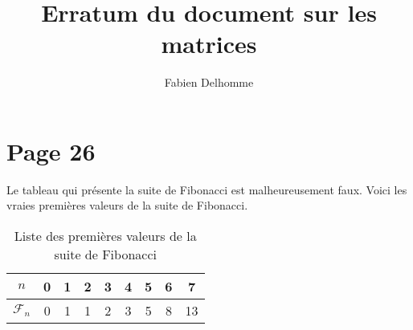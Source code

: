 \documentclass[12pt]{article}
\title{Erratum du document sur les matrices}
\author{Fabien Delhomme}
\begin{document}
\maketitle

\section{Page 26}

Le tableau qui présente la suite de Fibonacci est malheureusement faux. Voici
les vraies premières valeurs de la suite de Fibonacci.
\begin{table}[h]
    \centering
    \begin{tabular}{|c|c|c|c|c|c|c|c|c|}
        \hline
        $n$ & 0 & 1 & 2 & 3 & 4 & 5 & 6 & 7 \\
        \hline
        $\mathcal{F}_n$ & 0 & 1 & 1 & 2 & 3 & 5 & 8 & 13  \\
        \hline
    \end{tabular}
    \caption{Liste des premières valeurs de la suite de Fibonacci}
\end{table}
\end{document}
